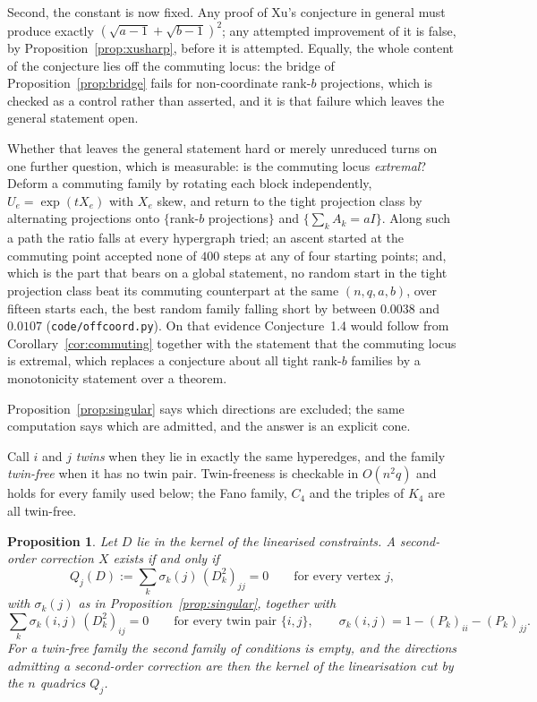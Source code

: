 \documentclass[11pt]{article}
\newtheorem{proposition}[theorem]{Proposition}
\theoremstyle{remark}
\begin{document}
Second, the constant is now fixed. Any proof of Xu's conjecture in general must produce exactly
$(\sqrt{a-1}+\sqrt{b-1})^2$; any attempted improvement of it is false, by
Proposition~\ref{prop:xusharp}, before it is attempted. Equally, the whole content of the
conjecture lies off the commuting locus: the bridge of Proposition~\ref{prop:bridge} fails for
non-coordinate rank-$b$ projections, which is checked as a control rather than asserted, and it is
that failure which leaves the general statement open.

Whether that leaves the general statement hard or merely unreduced turns on one further
question, which is measurable: is the commuting locus \emph{extremal}? Deform a commuting family
by rotating each block independently, $U_e=\exp(tX_e)$ with $X_e$ skew, and return to the tight
projection class by alternating projections onto $\{$rank-$b$ projections$\}$ and
$\{\sum_kA_k=aI\}$. Along such a path the ratio falls at every hypergraph tried; an ascent
started at the commuting point accepted none of $400$ steps at any of four starting points; and,
which is the part that bears on a global statement, no random start in the tight projection class
beat its commuting counterpart at the same $(n,q,a,b)$, over fifteen starts each, the best random
family falling short by between $0.0038$ and $0.0107$ (\texttt{code/offcoord.py}). On that
evidence Conjecture~1.4 would follow from Corollary~\ref{cor:commuting} together with the
statement that the commuting locus is extremal, which replaces a conjecture about all tight
rank-$b$ families by a monotonicity statement over a theorem.

Proposition~\ref{prop:singular} says which directions are excluded; the same computation says
which are admitted, and the answer is an explicit cone.

Call $i$ and $j$ \emph{twins} when they lie in exactly the same hyperedges, and the family
\emph{twin-free} when it has no twin pair. Twin-freeness is checkable in $O(n^2q)$ and holds for
every family used below; the Fano family, $C_4$ and the triples of $K_4$ are all twin-free.

\begin{proposition}\label{prop:cone}
Let $D$ lie in the kernel of the linearised constraints. A second-order correction $X$ exists if and
only if
\[
Q_j(D):=\sum_k\sigma_k(j)\,(D_k^2)_{jj}=0\qquad\text{for every vertex }j,
\]
with $\sigma_k(j)$ as in Proposition~\ref{prop:singular}, \emph{together with}
\[
\sum_k\sigma_k(i,j)\,(D_k^2)_{ij}=0\qquad\text{for every twin pair }\{i,j\},
\qquad \sigma_k(i,j)=1-(P_k)_{ii}-(P_k)_{jj}.
\]
For a twin-free family the second family of conditions is empty, and the directions admitting a
second-order correction are then the kernel of the linearisation cut by the $n$ quadrics $Q_j$.
\end{proposition}
\end{document}
